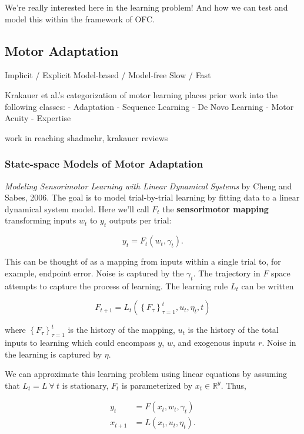 \documentclass[../main.tex]{subfiles}
\begin{document}
We're really interested here in the learning problem! And how we can
test and model this within the framework of OFC.

\subsection{Motor Adaptation}\label{motor-adaptation}

Implicit / Explicit Model-based / Model-free Slow / Fast

Krakauer et al.'s categorization of motor learning places prior work
into the following classes: - Adaptation - Sequence Learning - De Novo
Learning - Motor Acuity - Expertise

work in reaching shadmehr, krakauer reviews

\subsubsection{State-space Models of Motor
Adaptation}\label{state-space-models-of-motor-adaptation}

\emph{Modeling Sensorimotor Learning with Linear Dynamical Systems} by
Cheng and Sabes, 2006. The goal is to model trial-by-trial learning by
fitting data to a linear dynamical system model. Here we'll call \(F_t\)
the \textbf{sensorimotor mapping} transforming inputs \(w_t\) to \(y_t\)
outputs per trial:

\[
y_t = F_t(w_t, \gamma_t).
\]

This can be thought of as a mapping from inputs within a single trial
to, for example, endpoint error. Noise is captured by the \(\gamma_t\).
The trajectory in \(F\) space attempts to capture the process of
learning. The learning rule \(L_t\) can be written

\[F_{t+1} = L_t\left(\left\{F_\tau\right\}_{\tau=1}^{t}, u_t, \eta_t, t\right)\]

where \(\left\{F_\tau\right\}_{\tau=1}^{t}\) is the history of the
mapping, \(u_t\) is the history of the total inputs to learning which
could encompass \(y\), \(w\), and exogenous inputs \(r\). Noise in the
learning is captured by \(\eta\).

We can approximate this learning problem using linear equations by
assuming that \(L_t=L \ \forall \ t\) is stationary, \(F_t\) is
parameterized by \(x_t\in\mathbb{R}^y\). Thus,

\[
\begin{aligned}
y_t &= F(x_t, w_t, \gamma_t) \\
x_{t+1} &= L(x_t, u_t, \eta_t).
\end{aligned}
\]
\end{document}
